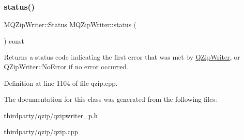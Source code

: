 \subsubsection{\texorpdfstring{status()}{status()}}
{\footnotesize\ttfamily M\+Q\+Zip\+Writer\+::\+Status M\+Q\+Zip\+Writer\+::status (\begin{DoxyParamCaption}{ }\end{DoxyParamCaption}) const}

Returns a status code indicating the first error that was met by \hyperlink{class_q_zip_writer}{Q\+Zip\+Writer}, or Q\+Zip\+Writer\+::\+No\+Error if no error occurred. 

Definition at line 1104 of file qzip.\+cpp.



The documentation for this class was generated from the following files\+:\begin{DoxyCompactItemize}
\item 
thirdparty/qzip/qzipwriter\+\_\+p.\+h\item 
thirdparty/qzip/qzip.\+cpp\end{DoxyCompactItemize}
